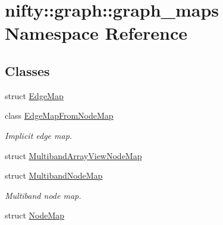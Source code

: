 \hypertarget{namespacenifty_1_1graph_1_1graph__maps}{}\section{nifty\+:\+:graph\+:\+:graph\+\_\+maps Namespace Reference}
\label{namespacenifty_1_1graph_1_1graph__maps}
\subsection*{Classes}
\begin{DoxyCompactItemize}
\item 
struct \hyperlink{structnifty_1_1graph_1_1graph__maps_1_1EdgeMap}{Edge\+Map}
\item 
class \hyperlink{classnifty_1_1graph_1_1graph__maps_1_1EdgeMapFromNodeMap}{Edge\+Map\+From\+Node\+Map}
\begin{DoxyCompactList}\small\item\em Implicit edge map. \end{DoxyCompactList}\item 
struct \hyperlink{structnifty_1_1graph_1_1graph__maps_1_1MultibandArrayViewNodeMap}{Multiband\+Array\+View\+Node\+Map}
\item 
struct \hyperlink{structnifty_1_1graph_1_1graph__maps_1_1MultibandNodeMap}{Multiband\+Node\+Map}
\begin{DoxyCompactList}\small\item\em Multiband node map. \end{DoxyCompactList}\item 
struct \hyperlink{structnifty_1_1graph_1_1graph__maps_1_1NodeMap}{Node\+Map}
\end{DoxyCompactItemize}
